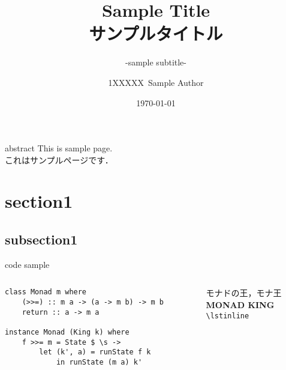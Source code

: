 \documentclass[aspectratio=1610,14pt]{beamer}
\title{%
    Sample Title \\
    サンプルタイトル
}
\subtitle{
    -sample subtitle-
}
\author{%
    1XXXXX\ Sample Author
}
\institute[Sample Univ.]{%
    Sample Univ. 
}
\date{%
    \today
}
\begin{document}
%
%
\begin{frame}
\maketitle 
\end{frame}

\begin{frame}[fragile]{abstract}
This is sample page.\\[4pt] 
これはサンプルページです．
\end{frame}

\section{section1}
\subsection{subsection1}

\begin{frame}
    \tableofcontents[currentsection]
\end{frame}

\begin{frame}[fragile]{code sample}
    \begin{columns}
        \begin{column}{0.5\textwidth}
            \begin{lstlisting}
class Monad m where 
    (>>=) :: m a -> (a -> m b) -> m b 
    return :: a -> m a

instance Monad (King k) where
    f >>= m = State $ \s ->
        let (k', a) = runState f k
            in runState (m a) k'
            \end{lstlisting}
        \end{column}
        \begin{column}{0.5\textwidth}
            モナドの王，モナ王 \\
            \textbf{MONAD KING}\\
            \lstinline|\lstinline|
        \end{column}
    \end{columns}
\end{frame}
\end{document}
